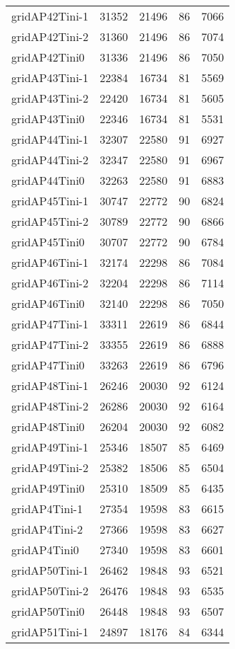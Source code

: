 \begin{tabular}{lrrrr}
gridAP42Tini-1 & 31352 & 21496 & 86 & 7066 \\
gridAP42Tini-2 & 31360 & 21496 & 86 & 7074 \\
gridAP42Tini0 & 31336 & 21496 & 86 & 7050 \\
gridAP43Tini-1 & 22384 & 16734 & 81 & 5569 \\
gridAP43Tini-2 & 22420 & 16734 & 81 & 5605 \\
gridAP43Tini0 & 22346 & 16734 & 81 & 5531 \\
gridAP44Tini-1 & 32307 & 22580 & 91 & 6927 \\
gridAP44Tini-2 & 32347 & 22580 & 91 & 6967 \\
gridAP44Tini0 & 32263 & 22580 & 91 & 6883 \\
gridAP45Tini-1 & 30747 & 22772 & 90 & 6824 \\
gridAP45Tini-2 & 30789 & 22772 & 90 & 6866 \\
gridAP45Tini0 & 30707 & 22772 & 90 & 6784 \\
gridAP46Tini-1 & 32174 & 22298 & 86 & 7084 \\
gridAP46Tini-2 & 32204 & 22298 & 86 & 7114 \\
gridAP46Tini0 & 32140 & 22298 & 86 & 7050 \\
gridAP47Tini-1 & 33311 & 22619 & 86 & 6844 \\
gridAP47Tini-2 & 33355 & 22619 & 86 & 6888 \\
gridAP47Tini0 & 33263 & 22619 & 86 & 6796 \\
gridAP48Tini-1 & 26246 & 20030 & 92 & 6124 \\
gridAP48Tini-2 & 26286 & 20030 & 92 & 6164 \\
gridAP48Tini0 & 26204 & 20030 & 92 & 6082 \\
gridAP49Tini-1 & 25346 & 18507 & 85 & 6469 \\
gridAP49Tini-2 & 25382 & 18506 & 85 & 6504 \\
gridAP49Tini0 & 25310 & 18509 & 85 & 6435 \\
gridAP4Tini-1 & 27354 & 19598 & 83 & 6615 \\
gridAP4Tini-2 & 27366 & 19598 & 83 & 6627 \\
gridAP4Tini0 & 27340 & 19598 & 83 & 6601 \\
gridAP50Tini-1 & 26462 & 19848 & 93 & 6521 \\
gridAP50Tini-2 & 26476 & 19848 & 93 & 6535 \\
gridAP50Tini0 & 26448 & 19848 & 93 & 6507 \\
gridAP51Tini-1 & 24897 & 18176 & 84 & 6344 \\

\end{tabular}
